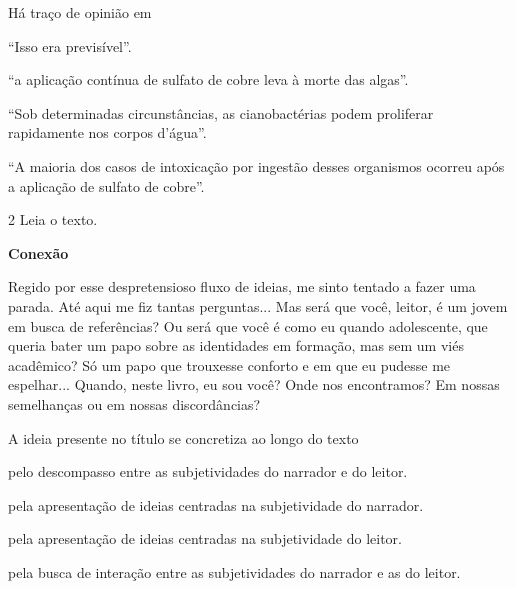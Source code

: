 Há traço de opinião em

\begin{escolha}[itemsep=0pt]
\item ``Isso era previsível''.

\item ``a aplicação contínua de sulfato de cobre leva à morte das algas''.

\item ``Sob determinadas circunstâncias, as cianobactérias podem proliferar
rapidamente nos corpos d'água''.

\item ``A maioria dos casos de intoxicação por ingestão desses organismos
ocorreu após a aplicação de sulfato de cobre''.
\end{escolha}

\pagebreak

\num{2} Leia o texto.

\begin{myquote}
\textbf{Conexão}

Regido por esse despretensioso fluxo de ideias, me sinto tentado a fazer
uma parada. Até aqui me fiz tantas perguntas... Mas será que você,
leitor, é um jovem em busca de referências? Ou será que você é como eu
quando adolescente, que queria bater um papo sobre as identidades em
formação, mas sem um viés acadêmico? Só um papo que trouxesse conforto e
em que eu pudesse me espelhar... Quando, neste livro, eu sou você? Onde
nos encontramos? Em nossas semelhanças ou em nossas discordâncias?

\end{myquote}

A ideia presente no título se concretiza ao longo do texto

\begin{escolha}
\item pelo descompasso entre as subjetividades do narrador e do leitor.

\item pela apresentação de ideias centradas na subjetividade do narrador.

\item pela apresentação de ideias centradas na subjetividade do leitor.

\item pela busca de interação entre as subjetividades do narrador e as do
leitor.
\end{escolha}

